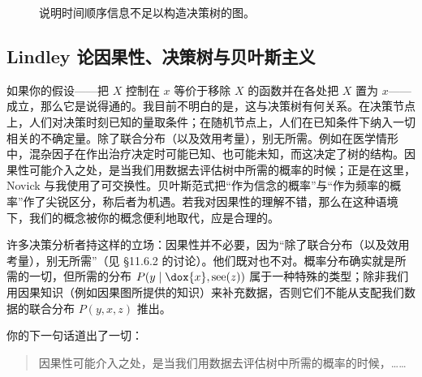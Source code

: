\begin{figure}[htbp]
\caption{说明时间顺序信息不足以构造决策树的图。}
\label{fig:11.17}
\end{figure}

\subsection{Lindley 论因果性、决策树与贝叶斯主义}


如果你的假设——把 $X$ 控制在 $x$ 等价于移除 $X$ 的函数并在各处把 $X$ 置为 $x$——成立，那么它是说得通的。我目前不明白的是，这与决策树有何关系。在决策节点上，人们对决策时刻已知的量取条件；在随机节点上，人们在已知条件下纳入一切相关的不确定量。除了联合分布（以及效用考量），别无所需。例如在医学情形中，混杂因子在作出治疗决定时可能已知、也可能未知，而这决定了树的结构。因果性可能介入之处，是当我们用数据去评估树中所需的概率的时候；正是在这里，Novick 与我使用了可交换性。贝叶斯范式把“作为信念的概率”与“作为频率的概率”作了尖锐区分，称后者为机遇。若我对因果性的理解不错，那么在这种语境下，我们的概念被你的概念便利地取代，应是合理的。


许多决策分析者持这样的立场：因果性并不必要，因为“除了联合分布（以及效用考量），别无所需”（见 \S11.6.2 的讨论）。他们既对也不对。概率分布确实就是所需的一切，但所需的分布 $P(y\mid\dox{x},\text{see}(z))$ 属于一种特殊的类型；除非我们用因果知识（例如因果图所提供的知识）来补充数据，否则它们不能从支配我们数据的联合分布 $P(y,x,z)$ 推出。

你的下一句话道出了一切：

\begin{quote}\kaishu
因果性可能介入之处，是当我们用数据去评估树中所需的概率的时候，……
\end{quote}

